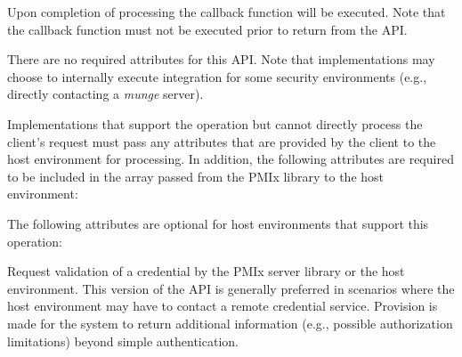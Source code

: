 Upon completion of processing the callback function will be executed. Note that the callback function must not be executed prior to return from the \ac{API}.

\reqattrstart
There are no required attributes for this \ac{API}. Note that implementations may choose to internally
execute integration for some security environments (e.g., directly
contacting a \textit{munge} server).

Implementations that support the operation but cannot directly process the client's request must pass any attributes that are provided by the client to the host environment for processing. In addition, the following attributes are required to be included in the  array passed from the \ac{PMIx} library to the host environment:


\reqattrend

\optattrstart
The following attributes are optional for host environments that support this operation:


\optattrend

\descr

Request validation of a credential by the \ac{PMIx} server library or the host environment. This version of the \ac{API} is generally preferred in scenarios where the host environment may have to contact a remote credential service. Provision is made for the system to return additional information (e.g., possible authorization limitations) beyond simple authentication.


